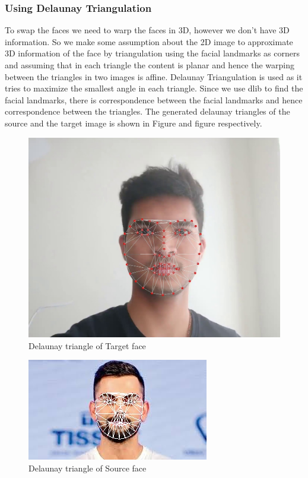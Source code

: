 \documentclass[conference]{IEEEtran}
\begin{document}
\subsubsection{Using Delaunay Triangulation}
To swap the faces we need to warp the faces in 3D, however we don’t have 3D information. So we make some assumption about the 2D image to approximate 3D information of the face by triangulation using the facial landmarks as corners and assuming that in each triangle the content is planar and hence the warping between the triangles in two images is affine. Delaunay Triangulation is used as it tries to maximize the smallest angle in each triangle. Since we use dlib to find the facial landmarks, there is correspondence between the facial landmarks and hence correspondence between the triangles.
The generated delaunay triangles of the source and the target image is shown in Figure and figure respectively.
\begin{figure}[H]
\includegraphics[scale=0.18]{dt.jpg}
\centering
\caption{Delaunay triangle of Target face}
\end{figure}
\begin{figure}[H]
\includegraphics[scale=0.85]{ds.jpg}
\centering
\caption{Delaunay triangle of Source face}
\end{figure}
\end{document}

